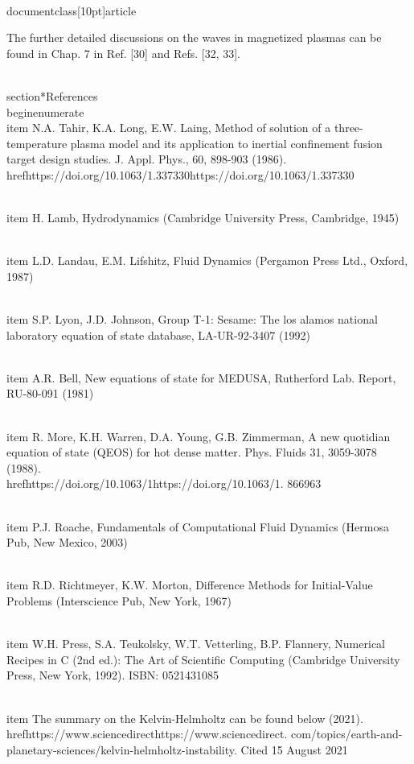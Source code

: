 \\documentclass[10pt]{article}
\begin{document}
{{{{The further detailed discussions on the waves in magnetized plasmas can be found in Chap. 7 in Ref. [30] and Refs. [32, 33].

\\section*{References}
\\begin{enumerate}
  \\item N.A. Tahir, K.A. Long, E.W. Laing, Method of solution of a three-temperature plasma model and its application to inertial confinement fusion target design studies. J. Appl. Phys., 60, 898-903 (1986). \\href{https://doi.org/10.1063/1.337330}{https://doi.org/10.1063/1.337330}

  \\item H. Lamb, Hydrodynamics (Cambridge University Press, Cambridge, 1945)

  \\item L.D. Landau, E.M. Lifshitz, Fluid Dynamics (Pergamon Press Ltd., Oxford, 1987)

  \\item S.P. Lyon, J.D. Johnson, Group T-1: Sesame: The los alamos national laboratory equation of state database, LA-UR-92-3407 (1992)

  \\item A.R. Bell, New equations of state for MEDUSA, Rutherford Lab. Report, RU-80-091 (1981)

  \\item R. More, K.H. Warren, D.A. Young, G.B. Zimmerman, A new quotidian equation of state (QEOS) for hot dense matter. Phys. Fluids 31, 3059-3078 (1988). \\href{https://doi.org/10.1063/1}{https://doi.org/10.1063/1}. 866963

  \\item P.J. Roache, Fundamentals of Computational Fluid Dynamics (Hermosa Pub, New Mexico, 2003)

  \\item R.D. Richtmeyer, K.W. Morton, Difference Methods for Initial-Value Problems (Interscience Pub, New York, 1967)

  \\item W.H. Press, S.A. Teukolsky, W.T. Vetterling, B.P. Flannery, Numerical Recipes in C (2nd ed.): The Art of Scientific Computing (Cambridge University Press, New York, 1992). ISBN: 0521431085

  \\item The summary on the Kelvin-Helmholtz can be found below (2021). \\href{https://www.sciencedirect}{https://www.sciencedirect}. com/topics/earth-and-planetary-sciences/kelvin-helmholtz-instability. Cited 15 August 2021

}}}}
\end{document}
